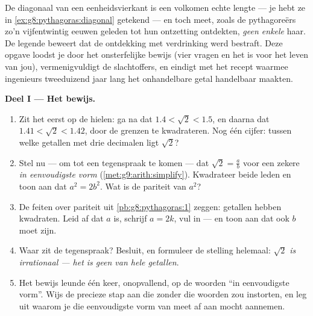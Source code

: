 \begin{problem}
\label{pb:g9:sqrt:1}
De diagonaal van een eenheidsvierkant is een volkomen echte lengte --- je hebt ze
in \cref{ex:g8:pythagoras:diagonal} getekend --- en toch meet, zoals de
pythagoreërs zo'n vijfentwintig eeuwen geleden tot hun ontzetting ontdekten,
\emph{geen enkele } haar. De legende beweert dat de ontdekking met
verdrinking werd bestraft. Deze opgave loodst je door het onsterfelijke bewijs
(vier vragen en het is voor het leven van jou), vermenigvuldigt de slachtoffers,
en eindigt met het recept waarmee ingenieurs tweeduizend jaar lang het
onhandelbare getal handelbaar maakten.

\medskip
\noindent\textbf{Deel I --- Het bewijs.}
\begin{enumerate}
  \item Zit het eerst op de hielen: ga na dat $1.4 < \sqrt2 < 1.5$, en daarna dat
        $1.41 < \sqrt2 < 1.42$, door de grenzen te kwadrateren. Nog één cijfer:
        tussen welke getallen met drie decimalen ligt $\sqrt2$?
  \item Stel nu --- om tot een tegenspraak te komen --- dat $\sqrt2 = \frac ab$
        voor een zekere  \emph{in eenvoudigste vorm}
        (\cref{met:g9:arith:simplify}). Kwadrateer beide leden en toon aan dat
        $a^2 = 2 b^2$. Wat is de pariteit van $a^2$?
  \item De feiten over pariteit uit \cref{pb:g8:pythagoras:1} zeggen: 
        getallen hebben  kwadraten. Leid af dat $a$  is, schrijf
        $a = 2k$, vul in --- en toon aan dat ook $b$  moet zijn.
  \item Waar zit de tegenspraak? Besluit, en formuleer de stelling helemaal:
        \emph{$\sqrt2$ is irrationaal --- het is geen  van hele getallen}.
  \item Het bewijs leunde één keer, onopvallend, op de woorden ``in eenvoudigste
        vorm''. Wijs de precieze stap aan die zonder die woorden zou instorten, en
        leg uit waarom je die eenvoudigste vorm van meet af aan mocht aannemen.
\end{enumerate}


\end{problem}
